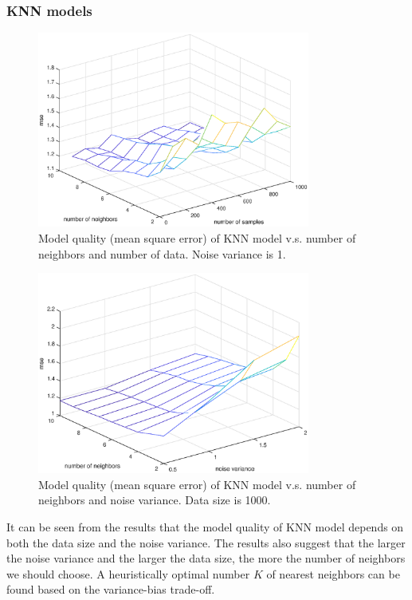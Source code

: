 \documentclass[]{article}
\begin{document}
\subsubsection{KNN models}
\begin{figure}[H]
	\caption{Model quality (mean square error) of KNN model v.s. number of neighbors and number of data. Noise variance is 1.}
	\label{fig:KNNnumberofdata}
	\centering
	\includegraphics[width=0.8\textwidth]{project3d1}
\end{figure}

\begin{figure}[H]
	\caption{Model quality (mean square error) of KNN model v.s. number of neighbors and noise variance. Data size is 1000.}
	\label{fig:KNNnoisevariance}
	\centering
	\includegraphics[width=0.8\textwidth]{project3d2}
\end{figure}

It can be seen from the results that the model quality of KNN model depends on both the data size and the noise variance. The results also suggest that the larger the noise variance and the larger the data size, the more the number of neighbors we should choose. A heuristically optimal number $K$ of nearest neighbors can be found based on the variance-bias trade-off. 
\end{document}
